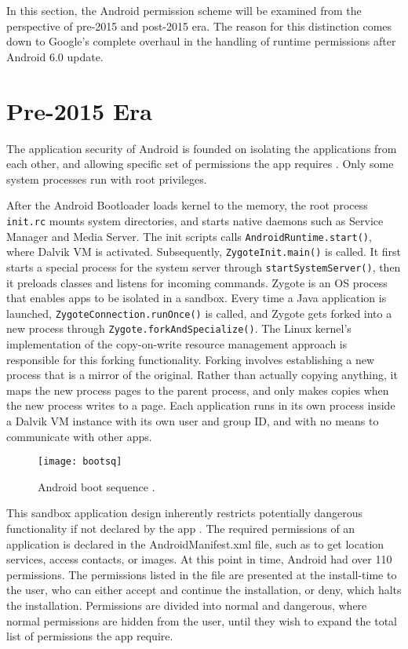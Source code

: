 \documentclass[
  a4paper,  %
  twoside,  %
  bibliography=totoc,
  headsepline,
  cleardoublepage=empty,
  parskip=half,
  draft=false,
  open=any
]{scrbook}
\begin{document}
In this section, the Android permission scheme will be examined from the perspective of pre-2015 and post-2015 era. The reason for this distinction comes down to Google's complete overhaul in the handling of runtime permissions after Android 6.0 update.

\section{Pre-2015 Era}
The application security of Android is founded on isolating the applications from each other, and allowing specific set of permissions the app requires \cite{liebergeld2013}. Only some system processes run with root privileges. 

After the Android Bootloader loads kernel to the memory, the root process \texttt{init.rc} mounts system directories, and starts native daemons such as Service Manager and Media Server. The init scripts calls \texttt{AndroidRuntime.start()}, where Dalvik VM is activated. Subsequently, \texttt{ZygoteInit.main()} is called. It first starts a special process for the system server through \texttt{startSystemServer()}, then it preloads classes and listens for incoming commands. Zygote is an OS process that enables apps to be isolated in a sandbox. Every time a Java application is launched, \texttt{ZygoteConnection.runOnce()} is called, and Zygote gets forked into a new process through \texttt{Zygote.forkAndSpecialize()}. The Linux kernel's implementation of the copy-on-write resource management approach is responsible for this forking functionality. Forking involves establishing a new process that is a mirror of the original. Rather than actually copying anything, it maps the new process pages to the parent process, and only makes copies when the new process writes to a page. Each application runs in its own process inside a Dalvik VM instance with its own user and group ID, and with no means to communicate with other apps.
\begin{figure}\centering
	\texttt{[image: bootsq]}
	\caption{Android boot sequence \cite{vidal2018}.}
	\label{bootsequence}
\end{figure}

This sandbox application design inherently restricts potentially dangerous  functionality if not declared by the app \cite{barrera2010}. The required permissions of an application is declared in the AndroidManifest.xml file, such as to get location services, access contacts, or images. At this point in time, Android had over 110 permissions. The permissions listed in the file are presented at the install-time to the user, who can either accept and continue the installation, or deny, which halts the installation. Permissions are divided into normal and dangerous, where normal permissions are hidden from the user, until they wish to expand the total list of permissions the app require. %
 
\end{document}
